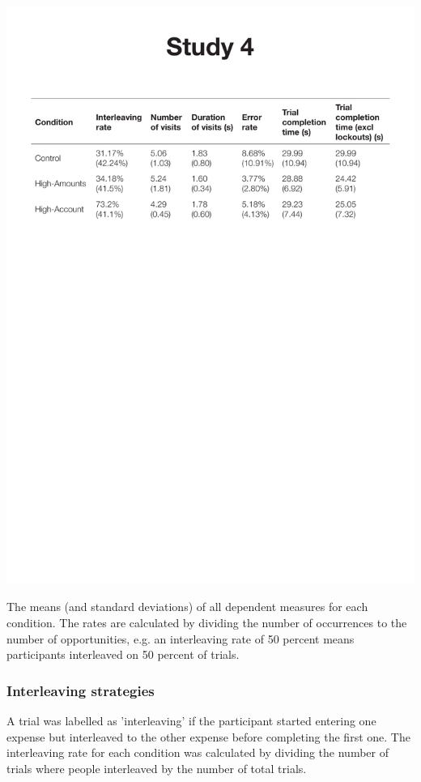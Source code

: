 \begin{table}
 \includegraphics[width=\textwidth]{images/ch34/ch34-means.pdf}
\caption{The means (and standard deviations) of all dependent measures for each condition. The rates are calculated by dividing the number of occurrences to the number of opportunities, e.g. an interleaving rate of 50 percent means participants interleaved on 50 percent of trials.}
\label{tbl:ch34_4-means}
\end{table}

\subsubsection{Interleaving strategies}
A trial was labelled as 'interleaving' if the participant started entering one expense but interleaved to the other expense before completing the first one. The interleaving rate for each condition was calculated by dividing the number of trials where people interleaved by the number of total trials.  

